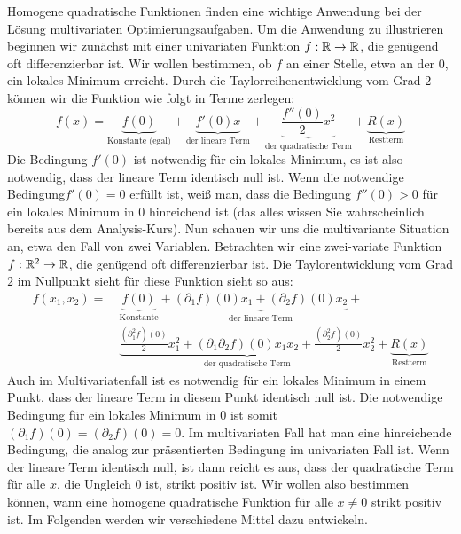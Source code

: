 Homogene quadratische Funktionen finden eine wichtige Anwendung bei der Lösung multivariaten Optimierungsaufgaben. Um die Anwendung zu illustrieren beginnen wir zunächst mit einer univariaten Funktion $ f : \mathbb R \to \mathbb R $, die genügend oft differenzierbar ist. Wir wollen bestimmen, ob $ f $ an einer Stelle, etwa an der 0, ein lokales Minimum erreicht. Durch die  Taylorreihenentwicklung vom Grad $2$ können wir die Funktion wie folgt in Terme zerlegen:
\begin{equation*}
	f(x) = \underbrace{f(0)}_{\text{Konstante (egal)}} + \underbrace{f'(0) x}_{\text{der lineare Term}} + \underbrace{\frac{f''(0)}{2}x^2}_{\text{der quadratische Term}} + \underbrace{R(x)}_{\text{Restterm}}
\end{equation*}
Die Bedingung $f'(0)$ ist notwendig für ein lokales Minimum, es ist also notwendig, dass der lineare Term identisch null ist.  Wenn die notwendige Bedingung$ f'(0) = 0 $ erfüllt ist, weiß man, dass die Bedingung $ f''(0) > 0 $ für ein lokales Minimum in $0$ hinreichend ist (das alles wissen Sie wahrscheinlich bereits aus dem Analysis-Kurs). Nun schauen wir uns die multivariante Situation an, etwa den Fall von zwei Variablen. Betrachten wir eine zwei-variate Funktion $ f : \mathbb R^2 \to \mathbb R $, die genügend oft differenzierbar ist. Die Taylorentwicklung vom Grad $2$ im Nullpunkt sieht für diese Funktion sieht so aus: 
\begin{align*}
	f(x_1,x_2) =&\ \underbrace{f(0)}_{\text{Konstante}} + \underbrace{(\partial_1f)(0)x_1 + (\partial_2f)(0)x_2}_{\text{der lineare Term}} + \\
	&\ \underbrace{\frac{(\partial_1^2f)(0)}{2}x_1^2 + (\partial_1\partial_2f)(0)x_1x_2 + \frac{(\partial_2^2f)(0)}{2}x_2^2}_{\text{der quadratische Term}} + \underbrace{R(x)}_{\text{Restterm}}
\end{align*}
Auch im Multivariatenfall ist es notwendig für ein lokales Minimum in einem Punkt, dass der lineare Term in diesem Punkt identisch null ist. 
Die notwendige Bedingung für ein lokales Minimum in $0$ ist somit $ (\partial_1f)(0) = (\partial_2f)(0) = 0 $. Im multivariaten Fall hat man eine hinreichende Bedingung, die analog zur präsentierten Bedingung im univariaten Fall ist.  Wenn der lineare Term identisch null, ist dann reicht es aus, dass der quadratische Term für alle $x$, die Ungleich $0$ ist, strikt positiv ist. Wir wollen also bestimmen können, wann eine homogene quadratische Funktion für alle $x \ne 0$ strikt positiv ist. Im Folgenden werden wir verschiedene Mittel dazu entwickeln. 

